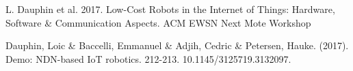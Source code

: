 
L. Dauphin et al. 
2017.  
Low-Cost Robots in the Internet of Things: Hardware, Software \& Communication Aspects.
ACM EWSN Next Mote Workshop

Dauphin, Loic \& Baccelli, Emmanuel \& Adjih, Cedric \& Petersen, Hauke. 
(2017). 
Demo: NDN-based IoT robotics. 
212-213. 10.1145/3125719.3132097.
